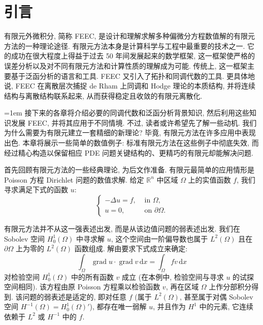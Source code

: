 \clearpage\setcounter{chapter}{0}
\chapter{引言}\label{chap:introduction}

有限元外微积分, 简称 FEEC, 是设计和理解求解多种偏微分方程数值解的有限元方法的一种理论途径. 有限元方法本身是计算科学与工程中最重要的技术之一. 它的成功在很大程度上得益于过去 50 年间发展起来的数学框架, 这一框架使严格的误差分析以及对不同有限元方法和计算性质的理解成为可能. 传统上, 这一框架主要基于泛函分析的语言和工具. FEEC 又引入了拓扑和同调代数的工具. 更具体地说, FEEC 在离散层次捕捉 de Rham 上同调和 Hodge 理论的本质结构, 并将连续结构与离散结构联系起来, 从而获得稳定且收敛的有限元离散化.

{\emergencystretch=1em
接下来的各章将介绍必要的同调代数和泛函分析背景知识, 然后利用这些知识发展 FEEC, 并将其应用于不同情境. 不过, 读者或许希望先了解一些动机. 我们为什么需要为有限元建立一套精细的新理论? 毕竟, 有限元方法在许多应用中表现出色. 本章将展示一些简单的数值例子: 标准有限元方法在这些例子中彻底失效, 而经过精心构造以保留相应 PDE 问题关键结构的、更精巧的有限元却能解决问题.
\par}

首先回顾有限元方法的一些经典理论, 为后文作准备. 有限元最简单的应用情形是 Poisson 方程 Dirichlet 问题的数值求解. 给定 $\mathbb R^n$ 中区域 $\Omega$ 上的实值函数 $f$, 我们寻求满足下式的函数 $u$:
\[
\begin{cases}
    -\Delta u=f,&\text{ in }\Omega,\\
    u=0,&\text{ on }\partial\Omega.
\end{cases}
\]

有限元方法并不从这一强表述出发, 而是从该边值问题的弱表述出发. 我们在 Sobolev 空间 $H^1_0(\Omega)$ 中寻求解 $u$, 这个空间由一阶偏导数也属于 $L^2(\Omega)$ 且在 $\partial\Omega$ 上为零的 $L^2(\Omega)$ 函数组成. 解由要求下式成立来确定:
\begin{equation}\label{eq:poisson-weak-form}
\int_\Omega\operatorname{grad}u\cdot\operatorname{grad}v\,\mathrm{d}x=\int_\Omega fv\,\mathrm{d}x
\end{equation}
对检验空间 $H^1_0(\Omega)$ 中的所有函数 $v$ 成立 (在本例中, 检验空间与寻求 $u$ 的试探空间相同). 该方程由原 Poisson 方程乘以检验函数 $v$, 再在区域 $\Omega$ 上作分部积分得到. 该问题的弱表述是适定的, 即对任意 $f$ (属于 $L^2(\Omega)$, 甚至属于对偶 Sobolev 空间 $H^{-1}(\Omega)=H^1_0(\Omega)'$), 都存在唯一弱解 $u$, 并且作为 $H^1$ 中的元素, 它连续依赖于 $L^2$ 或 $H^{-1}$ 中的 $f$.

